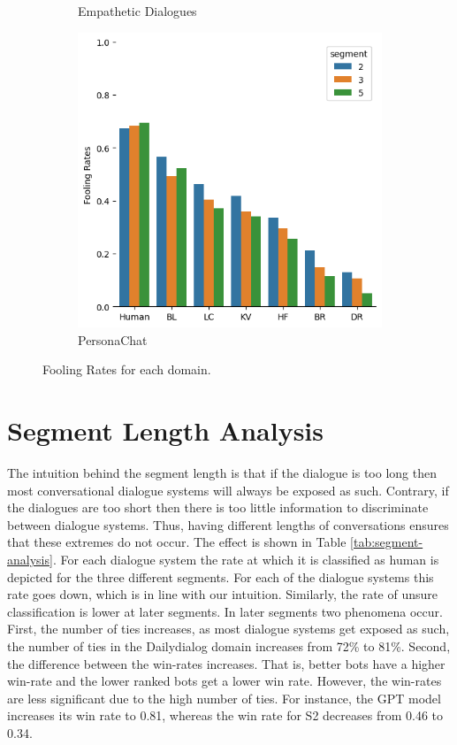 \documentclass[11pt,a4paper]{article}
\begin{document}
\begin{figure}[h!]
\begin{subfigure}[b]{0.3\textwidth}
    \caption{Empathetic Dialogues}
    \label{fig:2}
  \end{subfigure}
  \begin{subfigure}[b]{0.3\textwidth}
    \includegraphics[width=\textwidth]{figures/personachat/fooling_rates_over_time.png}
    \caption{PersonaChat}
    \label{fig:2}
  \end{subfigure}
  \caption{Fooling Rates for each domain. }
  \label{fig:fooling_rate}
\end{figure}


\section{Segment Length Analysis}

The intuition behind the segment length is that if the dialogue is too long then most conversational dialogue systems will always be exposed as such. Contrary, if the dialogues are too short then there is too little information to discriminate between dialogue systems. Thus, having different lengths of conversations ensures that these extremes do not occur. The effect is shown in Table \ref{tab:segment-analysis}. For each dialogue system the rate at which it is classified as human is depicted for the three different segments. For each of the dialogue systems this rate goes down, which is in line with our intuition. Similarly, the rate of unsure classification is lower at later segments. In later segments two phenomena occur. First, the number of ties increases, as most dialogue systems get exposed as such, the number of ties in the Dailydialog domain increases from 72\% to 81\%. Second, the difference between the win-rates increases. That is, better bots have a higher win-rate and the lower ranked bots get a lower win rate. However, the win-rates are less significant due to the high number of ties. For instance, the GPT model increases its win rate to 0.81, whereas the win rate for S2 decreases from 0.46 to 0.34.
\end{document}
